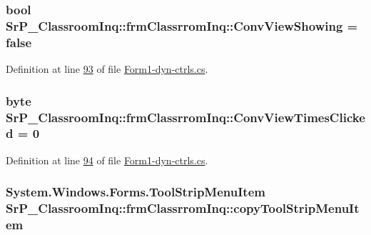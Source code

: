 \hypertarget{class_sr_p___classroom_inq_1_1frm_classrrom_inq_a5b2fbbaa361339e096aa4be3f8e2b2dd}{
\subsubsection[{\-Conv\-View\-Showing}]{\setlength{\rightskip}{0pt plus 5cm}bool {\bf \-Sr\-P\-\_\-\-Classroom\-Inq\-::frm\-Classrrom\-Inq\-::\-Conv\-View\-Showing} = false}}
\label{class_sr_p___classroom_inq_1_1frm_classrrom_inq_a5b2fbbaa361339e096aa4be3f8e2b2dd}


\-Definition at line \hyperlink{_form1-dyn-ctrls_8cs_source_l00093}{93} of file \hyperlink{_form1-dyn-ctrls_8cs_source}{\-Form1-\/dyn-\/ctrls.\-cs}.

\hypertarget{class_sr_p___classroom_inq_1_1frm_classrrom_inq_a8b7285b1ee1626d8ebdc99d4bd6046a8}{
\subsubsection[{\-Conv\-View\-Times\-Clicked}]{\setlength{\rightskip}{0pt plus 5cm}byte {\bf \-Sr\-P\-\_\-\-Classroom\-Inq\-::frm\-Classrrom\-Inq\-::\-Conv\-View\-Times\-Clicked} = 0}}
\label{class_sr_p___classroom_inq_1_1frm_classrrom_inq_a8b7285b1ee1626d8ebdc99d4bd6046a8}


\-Definition at line \hyperlink{_form1-dyn-ctrls_8cs_source_l00094}{94} of file \hyperlink{_form1-dyn-ctrls_8cs_source}{\-Form1-\/dyn-\/ctrls.\-cs}.

\hypertarget{class_sr_p___classroom_inq_1_1frm_classrrom_inq_a945826606f8dc78bfaaa45591619ecfc}{
\subsubsection[{copy\-Tool\-Strip\-Menu\-Item}]{\setlength{\rightskip}{0pt plus 5cm}\-System.\-Windows.\-Forms.\-Tool\-Strip\-Menu\-Item {\bf \-Sr\-P\-\_\-\-Classroom\-Inq\-::frm\-Classrrom\-Inq\-::copy\-Tool\-Strip\-Menu\-Item}}}
\label{class_sr_p___classroom_inq_1_1frm_classrrom_inq_a945826606f8dc78bfaaa45591619ecfc}


